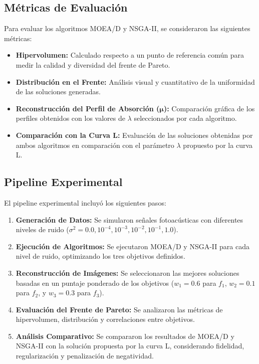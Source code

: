 \subsection{Métricas de Evaluación}
Para evaluar los algoritmos MOEA/D y NSGA-II, se consideraron las siguientes métricas:
\begin{itemize}
    \item \textbf{Hipervolumen:} Calculado respecto a un punto de referencia común para medir la calidad y diversidad del frente de Pareto.
    \item \textbf{Distribución en el Frente:} Análisis visual y cuantitativo de la uniformidad de las soluciones generadas.
    \item \textbf{Reconstrucción del Perfil de Absorción (\( \mathbf{\mu} \)):} Comparación gráfica de los perfiles obtenidos con los valores de \( \lambda \) seleccionados por cada algoritmo.
    \item \textbf{Comparación con la Curva L:} Evaluación de las soluciones obtenidas por ambos algoritmos en comparación con el parámetro \( \lambda \) propuesto por la curva L.
\end{itemize}

\subsection{Pipeline Experimental}
El pipeline experimental incluyó los siguientes pasos:
\begin{enumerate}
    \item \textbf{Generación de Datos:} Se simularon señales fotoacústicas con diferentes niveles de ruido (\( \sigma^2 = 0.0, 10^{-4}, 10^{-3}, 10^{-2}, 10^{-1}, 1.0 \)).
    \item \textbf{Ejecución de Algoritmos:} Se ejecutaron MOEA/D y NSGA-II para cada nivel de ruido, optimizando los tres objetivos definidos.
    \item \textbf{Reconstrucción de Imágenes:} Se seleccionaron las mejores soluciones basadas en un puntaje ponderado de los objetivos (\( w_1 = 0.6 \) para \( f_1 \), \( w_2 = 0.1 \) para \( f_2 \), y \( w_3 = 0.3 \) para \( f_3 \)).
    \item \textbf{Evaluación del Frente de Pareto:} Se analizaron las métricas de hipervolumen, distribución y correlaciones entre objetivos.
    \item \textbf{Análisis Comparativo:} Se compararon los resultados de MOEA/D y NSGA-II con la solución propuesta por la curva L, considerando fidelidad, regularización y penalización de negatividad.
\end{enumerate}

